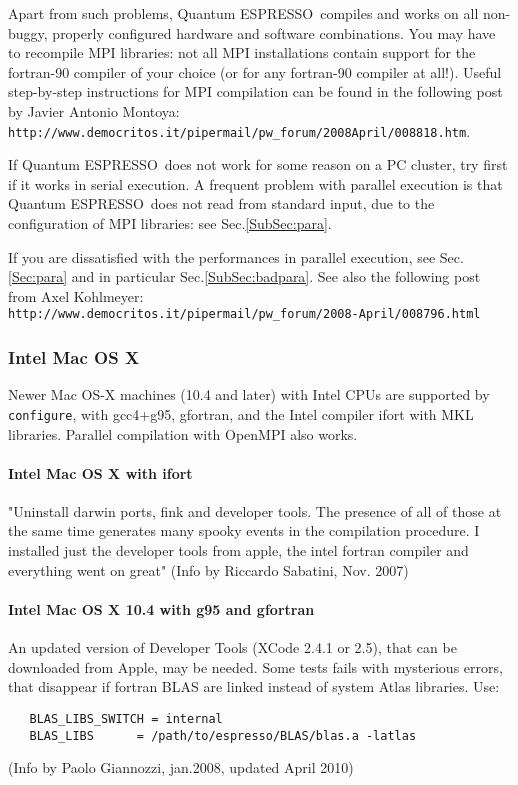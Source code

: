 \documentclass[12pt,a4paper]{article}
\def\qe{{\sc Quantum ESPRESSO}}
\def\configure{\texttt{configure}}
\begin{document}
Apart from such problems, \qe\ compiles and works on all non-buggy, properly
configured hardware and software combinations. You may have to
recompile MPI libraries: not all MPI installations contain support for
the fortran-90 compiler of your choice (or for any fortran-90 compiler
at all!). Useful step-by-step instructions for MPI compilation can be 
found in the following post by  Javier Antonio Montoya:\\
\texttt{http://www.democritos.it/pipermail/pw\_forum/2008April/008818.htm}. 

If \qe\ does not work for some reason on a PC cluster,
try first if it works in serial execution. A frequent problem with parallel
execution is that \qe\ does not read from standard input,
due to the configuration of MPI libraries: see Sec.\ref{SubSec:para}.

If you are dissatisfied with the performances in parallel execution,
see Sec.\ref{Sec:para} and in particular Sec.\ref{SubSec:badpara}.
See also the following post from Axel Kohlmeyer:\\
\texttt{http://www.democritos.it/pipermail/pw\_forum/2008-April/008796.html}

\subsubsection{Intel Mac OS X}

Newer Mac OS-X machines (10.4 and later) with Intel CPUs are supported 
by \configure,
with gcc4+g95, gfortran, and the Intel compiler ifort with MKL libraries.
Parallel compilation with OpenMPI also works.

\paragraph{Intel Mac OS X with ifort}

"Uninstall darwin ports, fink and developer tools. The presence of all of
those at the same time generates many spooky events in the compilation
procedure.  I installed just the developer tools from apple, the intel
fortran compiler and everything went on great" (Info by Riccardo Sabatini, 
Nov. 2007)

\paragraph{Intel Mac OS X 10.4 with g95 and gfortran}

An updated version of Developer Tools (XCode 2.4.1 or 2.5), that can be 
downloaded from Apple, may be needed. Some tests fails with mysterious 
errors, that disappear if
fortran BLAS are linked instead of system Atlas libraries. Use: 
\begin{verbatim}
   BLAS_LIBS_SWITCH = internal
   BLAS_LIBS      = /path/to/espresso/BLAS/blas.a -latlas
\end{verbatim}
(Info by Paolo Giannozzi, jan.2008, updated April 2010)
\end{document}
